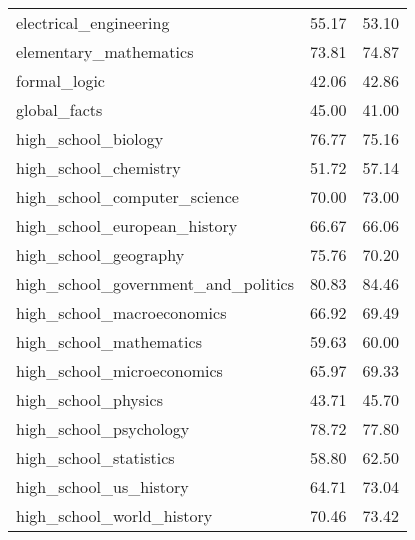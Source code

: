 \begin{table}[t]
\begin{tabular}{L{0.35}C{0.20}C{0.20}}
        electrical\_engineering                 & 55.17                    & 53.10                      \\
        elementary\_mathematics                 & 73.81                    & 74.87                      \\
        formal\_logic                           & 42.06                    & 42.86                      \\
        global\_facts                           & 45.00                    & 41.00                      \\
        high\_school\_biology                   & 76.77                    & 75.16                      \\
        high\_school\_chemistry                 & 51.72                    & 57.14                      \\
        high\_school\_computer\_science         & 70.00                    & 73.00                      \\
        high\_school\_european\_history         & 66.67                    & 66.06                      \\
        high\_school\_geography                 & 75.76                    & 70.20                      \\
        high\_school\_government\_and\_politics & 80.83                    & 84.46                      \\
        high\_school\_macroeconomics            & 66.92                    & 69.49                      \\
        high\_school\_mathematics               & 59.63                    & 60.00                      \\
        high\_school\_microeconomics            & 65.97                    & 69.33                      \\
        high\_school\_physics                   & 43.71                    & 45.70                      \\
        high\_school\_psychology                & 78.72                    & 77.80                      \\
        high\_school\_statistics                & 58.80                    & 62.50                      \\
        high\_school\_us\_history               & 64.71                    & 73.04                      \\
        high\_school\_world\_history            & 70.46                    & 73.42                      \\

\end{tabular}
\end{table}
